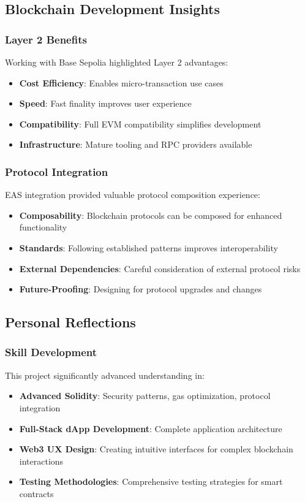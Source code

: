 \documentclass[12pt,a4paper]{article}
\begin{document}
\subsection{Blockchain Development Insights}

\subsubsection{Layer 2 Benefits}
Working with Base Sepolia highlighted Layer 2 advantages:
\begin{itemize}
    \item \textbf{Cost Efficiency}: Enables micro-transaction use cases
    \item \textbf{Speed}: Fast finality improves user experience
    \item \textbf{Compatibility}: Full EVM compatibility simplifies development
    \item \textbf{Infrastructure}: Mature tooling and RPC providers available
\end{itemize}

\subsubsection{Protocol Integration}
EAS integration provided valuable protocol composition experience:
\begin{itemize}
    \item \textbf{Composability}: Blockchain protocols can be composed for enhanced functionality
    \item \textbf{Standards}: Following established patterns improves interoperability
    \item \textbf{External Dependencies}: Careful consideration of external protocol risks
    \item \textbf{Future-Proofing}: Designing for protocol upgrades and changes
\end{itemize}

\subsection{Personal Reflections}

\subsubsection{Skill Development}
This project significantly advanced understanding in:
\begin{itemize}
    \item \textbf{Advanced Solidity}: Security patterns, gas optimization, protocol integration
    \item \textbf{Full-Stack dApp Development}: Complete application architecture
    \item \textbf{Web3 UX Design}: Creating intuitive interfaces for complex blockchain interactions
    \item \textbf{Testing Methodologies}: Comprehensive testing strategies for smart contracts
\end{itemize}
\end{document}
